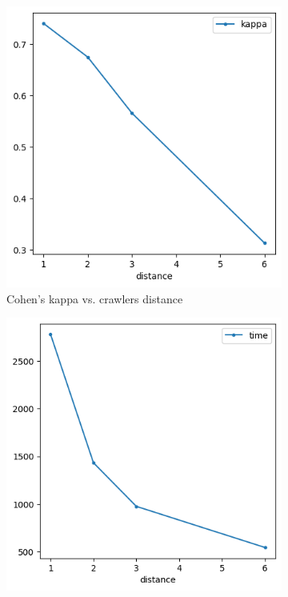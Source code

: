 \documentclass[francais,RandD]{rapportPFE}
\begin{document}
		\begin{figure}[h!]
			\begin{subfigure}[t]{0.49\linewidth}
				\includegraphics[width=\linewidth]{graphics/ski_nordique-kappa_vs_distance.png}
				\caption{Cohen's kappa vs. crawlers distance}
				\label{fig:ski_nordique-kappa_vs_distance}
			\end{subfigure}
			\hfill
			\begin{subfigure}[t]{0.49\linewidth}
					\includegraphics[width=\linewidth]{graphics/ski_nordique-time_vs_distance.png}

\end{subfigure}
\end{figure}
\end{document}
